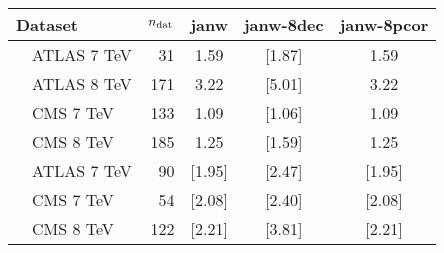 \begin{tabularx}{\textwidth}{Xrccc}
    \toprule
     Dataset                    & $n_{\rm dat}$ & janw &    janw-8dec   &  janw-8pcor     \\
    \midrule
     \ \ ATLAS 7 TeV            &         31  & 1.59 &  [1.87] &  1.59     \\
     \ \ ATLAS 8 TeV            &        171  & 3.22 &  [5.01] &  3.22     \\
     \ \ CMS   7 TeV            &        133  & 1.09 &  [1.06] &  1.09     \\
     \ \ CMS   8 TeV            &        185  & 1.25 & [1.59] &  1.25     \\
     \ \ ATLAS 7 TeV            &         90  & [1.95] & [2.47] & [1.95]    \\
     \ \ CMS   7 TeV            &         54  & [2.08] & [2.40] & [2.08]    \\
     \ \ CMS   8 TeV            &        122  & [2.21] & [3.81] & [2.21]    \\
    \bottomrule
\end{tabularx}
